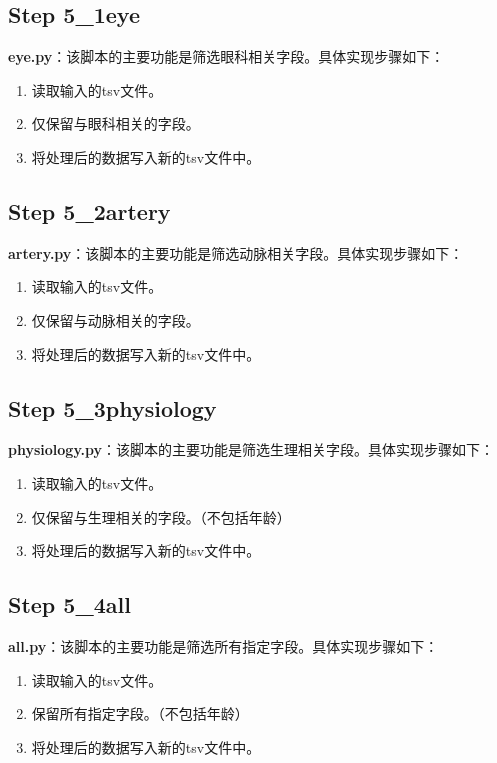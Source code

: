 \documentclass[UTF8]{report}
\theoremstyle{MyLineTheoremStyle} %
\theoremstyle{MyBlockTheoremStyle} %
\theoremstyle{MySubsubsectionStyle} %
\begin{document}
\subsection*{Step 5\_1eye}

\textbf{eye.py}：该脚本的主要功能是筛选眼科相关字段。具体实现步骤如下：
\begin{enumerate}
    \item 读取输入的tsv文件。
    \item 仅保留与眼科相关的字段。
    \item 将处理后的数据写入新的tsv文件中。
\end{enumerate}

\subsection*{Step 5\_2artery}

\textbf{artery.py}：该脚本的主要功能是筛选动脉相关字段。具体实现步骤如下：
\begin{enumerate}
    \item 读取输入的tsv文件。
    \item 仅保留与动脉相关的字段。
    \item 将处理后的数据写入新的tsv文件中。
\end{enumerate} 

\subsection*{Step 5\_3physiology}

\textbf{physiology.py}：该脚本的主要功能是筛选生理相关字段。具体实现步骤如下：
\begin{enumerate}
    \item 读取输入的tsv文件。
    \item 仅保留与生理相关的字段。（不包括年龄）
    \item 将处理后的数据写入新的tsv文件中。
\end{enumerate}

\subsection*{Step 5\_4all}

\textbf{all.py}：该脚本的主要功能是筛选所有指定字段。具体实现步骤如下：
\begin{enumerate}
    \item 读取输入的tsv文件。
    \item 保留所有指定字段。（不包括年龄）
    \item 将处理后的数据写入新的tsv文件中。
\end{enumerate}
\end{document}
